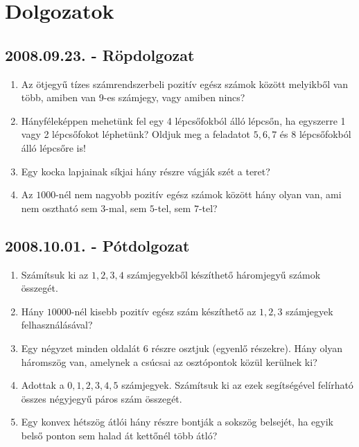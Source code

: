 \documentclass{article}
\begin{document}
\section*{Dolgozatok}

\subsection*{2008.09.23. - Röpdolgozat}
\begin{enumerate}
\item Az ötjegyű tízes számrendszerbeli pozitív egész számok között melyikből van több, amiben van 9-es számjegy, vagy amiben nincs?
\item Hányféleképpen mehetünk fel egy 4 lépcsőfokból álló lépcsőn, ha egyszerre 1 vagy 2 lépcsőfokot léphetünk? Oldjuk meg a feladatot $5,6,7$ és $8$ lépcsőfokból álló lépcsőre is!
\item Egy kocka lapjainak síkjai hány részre vágják szét a teret? 
\item Az $1000$-nél nem nagyobb pozitív egész számok között hány olyan van, ami nem osztható sem $3$-mal, sem $5$-tel, sem $7$-tel?


\end{enumerate}
\subsection*{2008.10.01. - Pótdolgozat}
\begin{enumerate}
\item Számítsuk ki az $1,2,3,4$ számjegyekből készíthető háromjegyű számok összegét.
\item Hány $10000$-nél kisebb pozitív egész szám készíthető az $1,2,3$ számjegyek felhasználásával?
\item Egy négyzet minden oldalát 6 részre osztjuk (egyenlő részekre). Hány olyan háromszög van, amelynek a csúcsai az osztópontok közül kerülnek ki?
\item Adottak a $0,1,2,3,4,5$ számjegyek. Számítsuk ki az ezek segítségével felírható összes négyjegyű páros szám összegét.
\item Egy konvex hétszög átlói hány részre bontják a sokszög belsejét, ha egyik belső ponton sem halad át kettőnél több átló?
\end{enumerate}
\end{document}
